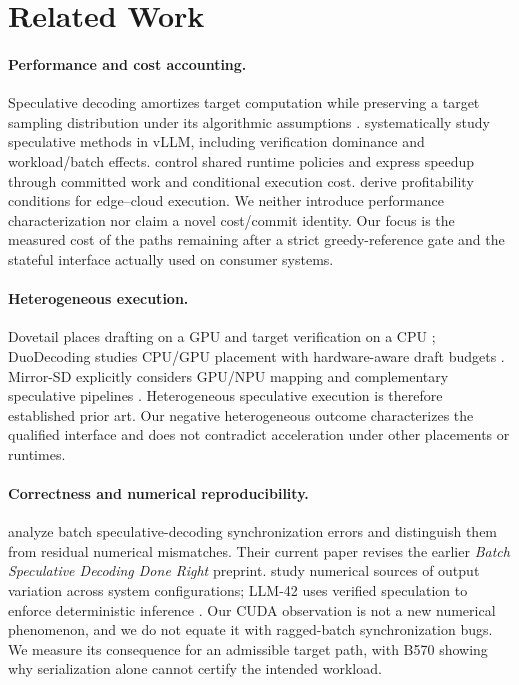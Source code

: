 \section{Related Work}
\label{sec:related}
\paragraph{Performance and cost accounting.}
Speculative decoding amortizes target computation while preserving a target sampling distribution under its algorithmic assumptions \citep{leviathan2023}. \citet{illusion} systematically study speculative methods in vLLM, including verification dominance and workload/batch effects. \citet{specllm} control shared runtime policies and express speedup through committed work and conditional execution cost. \citet{distance} derive profitability conditions for edge--cloud execution. We neither introduce performance characterization nor claim a novel cost/commit identity. Our focus is the measured cost of the paths remaining after a strict greedy-reference gate and the stateful interface actually used on consumer systems.

\paragraph{Heterogeneous execution.}
Dovetail places drafting on a GPU and target verification on a CPU \citep{dovetail}; DuoDecoding studies CPU/GPU placement with hardware-aware draft budgets \citep{duodecoding}. Mirror-SD explicitly considers GPU/NPU mapping and complementary speculative pipelines \citep{mirror}. Heterogeneous speculative execution is therefore established prior art. Our negative heterogeneous outcome characterizes the qualified interface and does not contradict acceleration under other placements or runtimes.

\paragraph{Correctness and numerical reproducibility.}
\citet{batchcorrect} analyze batch speculative-decoding synchronization errors and distinguish them from residual numerical mismatches. Their current paper revises the earlier \emph{Batch Speculative Decoding Done Right} preprint. \citet{numerics} study numerical sources of output variation across system configurations; LLM-42 uses verified speculation to enforce deterministic inference \citep{llm42}. Our CUDA observation is not a new numerical phenomenon, and we do not equate it with ragged-batch synchronization bugs. We measure its consequence for an admissible target path, with B570 showing why serialization alone cannot certify the intended workload.

